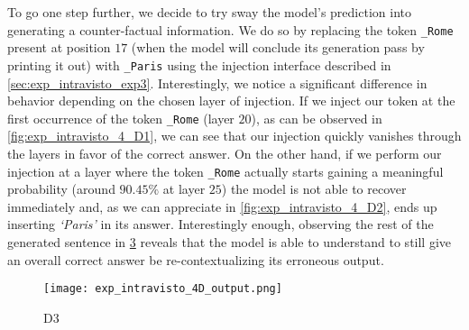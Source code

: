 \begin{figure}[t!]
    \centering
    \quad
    \caption{}
    \label{fig:exp_intravisto_4_C}
\end{figure}

To go one step further, we decide to try  sway the model's prediction into generating a counter-factual information.
We do so by replacing the token \texttt{\_Rome} present at position $17$ (when the model will conclude its generation pass by printing it out) with \texttt{\_Paris} using the injection interface described in \cref{sec:exp_intravisto_exp3}.
Interestingly, we notice a significant difference in behavior depending on the chosen layer of injection.
If we inject our token at the first occurrence of the token \texttt{\_Rome} (layer $20$), as can be observed in \cref{fig:exp_intravisto_4_D1}, we can see that our injection quickly vanishes through the layers in favor of the correct answer.
On the other hand, if we perform our injection at a layer where the token \texttt{\_Rome} actually starts gaining a meaningful probability (around $90.45\%$ at layer $25$) the model is not able to recover immediately and, as we can appreciate in \cref{fig:exp_intravisto_4_D2}, ends up inserting \emph{`Paris'} in its answer.
Interestingly enough, observing the rest of the generated sentence in \cref{fig:exp_intravisto_4_D3} reveals that the model is able to understand to still give an overall correct answer be re-contextualizing its erroneous output.

\begin{figure}[t!]
    \centering
    \quad
    \caption{}
    \label{fig:exp_intravisto_4_D}
\end{figure}

\begin{figure}[t!]
    \centering
    \texttt{[image: exp\_intravisto\_4D\_output.png]}
    \caption{D3}
    \label{fig:exp_intravisto_4_D3}
\end{figure}

